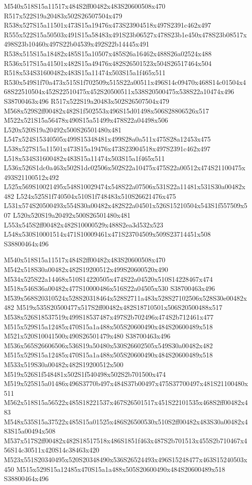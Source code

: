 \documentclass{article}
\begin{document}
\begin{multicols}{2}
M540x518S15a11517x484S2ff00482x483S20600508x470 R517x522S19a20483x502S26507504x479 R538x527S15a11501x473S15a19476x473S23904518x497S2391c462x497 R555x522S15a50503x491S15a58483x491S23b06527x478S23b1e450x478S23b08517x498S23b10460x497S22b04539x492S22b14445x491 R538x515S15a18482x485S15a10507x485S26a16462x488S26a02524x488 R536x517S15a41501x482S15a49476x482S26501523x504S26517464x504 R518x534S31600482x483S15a11474x503S15a1f465x511 R530x549S1f70a473x515S1f702509x515S22a00511x496S14c09470x468S14c01504x468S22510504x452S22510475x452S20500511x538S20500475x538S22a10474x496 S38700463x496 R517x522S19a20483x502S26507504x479 M568x529S2ff00482x482S1f502553x496S15d01498x506S28806526x517 M522x521S15a56478x490S15a51499x478S22a04498x506 L520x520S19a20492x500S26501480x481 L547x524S15340505x499S15348481x499S28a0a511x475S28a12453x475 L538x527S15a11501x473S15a19476x473S23904518x497S2391c462x497 L518x534S31600482x483S15a11474x503S15a1f465x511 L536x526S1dc0a463x502S1dc02506x502S22a10475x475S22a00512x474S21100475x493S21100512x492 L525x569S10021495x548S10029474x548S22a07506x531S22a11481x531S30a00482x482 L524x525S1f740504x510S1f748483x510S26621476x475 L531x574S20500493x554S30a00482x482S22a04501x526S15210504x543S1f557509x507 L520x520S19a20492x500S26501480x481 L553x545S2ff00482x482S10000529x488S2ea3d532x523 L548x530S10001514x471S10009461x471S23704509x509S23714451x508 S38800464x496

M540x518S15a11517x484S2ff00482x483S20600508x470 M542x518S30a00482x482S19200512x499S20600520x490 M534x525S22a14468x510S14220505x474S22a04520x510S14228467x474 M518x546S36a00482x477S10000486x516S22a04505x530 S38700463x496 M539x568S20310524x528S20318464x528S2711a483x528S27102506x528S30e00482x482 M519x535S20500477x517S2ff00482x482S18710501x506S20500488x517 M538x526S18537519x499S18537487x497S2b702496x474S2b712461x477 M515x529S15a12485x470S15a1a488x505S20600490x484S20600489x518 M521x520S10041500x490S26501479x480 S38700463x496 M536x565S26606506x536S19a50480x530S26602505x549S30a00482x482 M515x529S15a12485x470S15a1a488x505S20600490x484S20600489x518 M533x519S30a00482x482S19200512x500 M519x526S1f548481x502S1f540498x502S2b701500x474 M519x525S15a01486x496S3770b497x484S37b00497x475S37700497x481S21100480x511 M562x518S15a56522x485S18221537x467S26501517x451S22101535x468S2ff00482x483 M548x535S15a37522x485S15a01525x486S26500530x510S2ff00482x483S30a00482x483S15a00494x508 M537x517S2ff00482x482S18517518x486S1851f463x487S2b701513x455S2b710467x456S14c30511x420S14c38463x420 M523x551S20340495x520S20348490x536S26524493x496S15248477x463S15240503x450 M515x529S15a12485x470S15a1a488x505S20600490x484S20600489x518 S38800464x496


\end{multicols}
\end{document}
